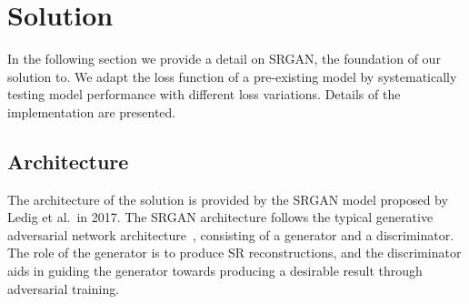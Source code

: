 \section{Solution}
In the following section we provide a detail on SRGAN, the foundation of our solution to. We adapt the loss function of a pre-existing model by systematically testing model performance with different loss variations. Details of the implementation are presented.

\subsection{Architecture}\label{subsec:architecture}
The architecture of the solution is provided by the SRGAN model proposed by Ledig et al.\ in 2017. The SRGAN architecture follows the typical generative adversarial network architecture~\cite{gan}, consisting of a generator and a discriminator. The role of the generator is to produce SR reconstructions, and the discriminator aids in guiding the generator towards producing a desirable result through adversarial training.

